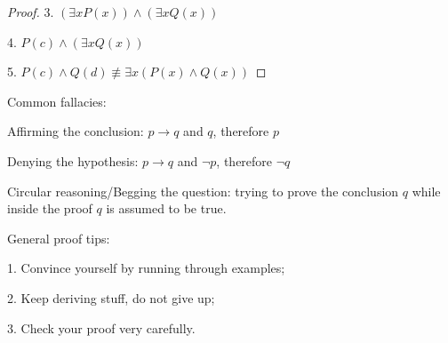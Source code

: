 \begin{defn}
\begin{proof}
3. $(\exists x P(x)) \land (\exists x Q(x))$

4. $P(c) \land (\exists x Q(x))$

5. $P(c) \land Q(d) \not \equiv \exists x (P(x) \land Q(x))$

\end{proof}

Common fallacies:

Affirming the conclusion: $p \rightarrow q$ and $q$, therefore $p$

Denying the hypothesis: $p \rightarrow q$ and $\lnot p$, therefore $\lnot q$

Circular reasoning/Begging the question: trying to prove the conclusion $q$ while inside the proof $q$ is assumed to be true.

General proof tips:

1. Convince yourself by running through examples;

2. Keep deriving stuff, do not give up;

3. Check your proof very carefully.





\end{defn}

